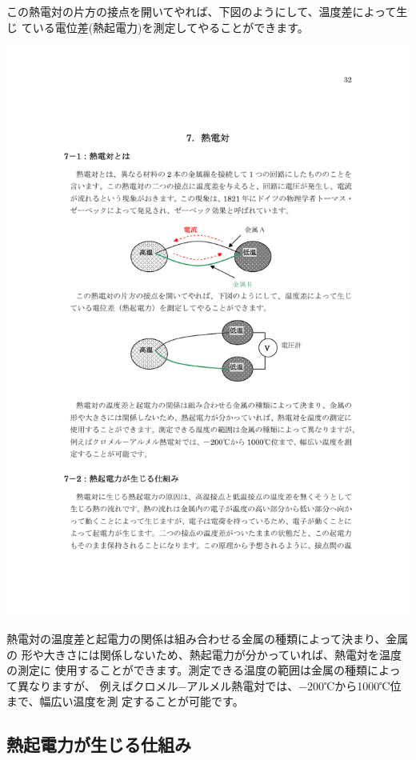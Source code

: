 この熱電対の片方の接点を開いてやれば、下図のようにして、温度差によって生じ 
ている電位差(熱起電力)を測定してやることができます。

\begin{center}
\includegraphics[bb=178 340 443 443]{10_Thermocouple/thermocouple2.pdf}
\end{center}

熱電対の温度差と起電力の関係は組み合わせる金属の種類によって決まり、金属の 
形や大きさには関係しないため、熱起電力が分かっていれば、熱電対を温度の測定に 
使用することができます。測定できる温度の範囲は金属の種類によって異なりますが、 
例えばクロメル−アルメル熱電対では、$-200$℃から1000℃位まで、幅広い温度を測 
定することが可能です。

\subsection{熱起電力が生じる仕組み}

